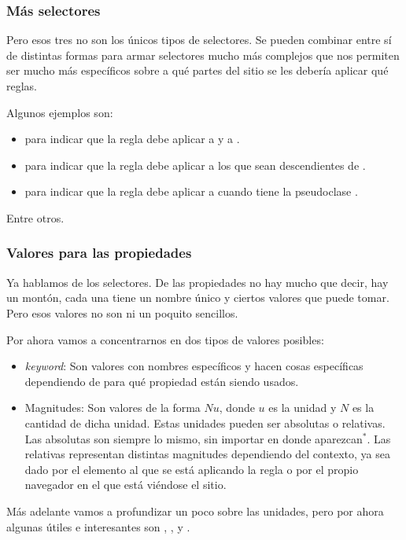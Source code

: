 \begin{frame}[fragile]
    \frametitle{Más selectores}
    
    Pero esos tres no son los únicos tipos de selectores. Se pueden combinar 
    entre sí de distintas formas para armar selectores mucho más complejos 
    que nos permiten ser mucho más específicos sobre a qué partes del sitio 
    se les debería aplicar qué reglas.

    Algunos ejemplos son:
    
    \begin{itemize}
        \item {} para indicar que la regla debe aplicar a 
               y a .
        \item {} para indicar que la regla debe aplicar a los 
               que sean descendientes de .
        \item {} para indicar que la regla debe 
              aplicar a  cuando tiene la pseudoclase .
    \end{itemize}

    Entre otros.

\end{frame}

\begin{frame}[fragile]
    \frametitle{Valores para las propiedades}
    
    Ya hablamos de los selectores. De las propiedades no hay mucho que decir, 
    hay un montón, cada una tiene un nombre único y ciertos valores que puede 
    tomar. Pero esos valores no son ni un poquito sencillos.

    Por ahora vamos a concentrarnos en dos tipos de valores posibles:

    \begin{itemize}
        \item \emph{keyword}: Son valores con nombres específicos y hacen 
              cosas específicas dependiendo de para qué propiedad están siendo usados.
        \item Magnitudes: Son valores de la forma $Nu$, donde $u$ es la unidad y 
              $N$ es la cantidad de dicha unidad. Estas unidades pueden ser 
              absolutas o relativas. Las absolutas son siempre lo mismo, sin importar 
              en donde aparezcan$^*$. Las relativas representan distintas magnitudes 
              dependiendo del contexto, ya sea dado por el elemento al que se está 
              aplicando la regla o por el propio navegador en el que está viéndose 
              el sitio.
    \end{itemize}

    Más adelante vamos a profundizar un poco sobre las unidades, pero por ahora 
    algunas útiles e interesantes son , , \inlinecode{\%} 
    y .

\end{frame}

